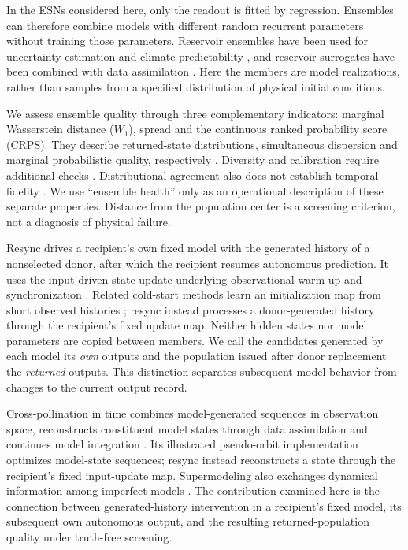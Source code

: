 \documentclass[gmd,manuscript]{copernicus}
\begin{document}
In the ESNs considered here, only the readout is fitted by regression. Ensembles can therefore combine models with different random recurrent parameters without training those parameters. Reservoir ensembles have been used for uncertainty estimation and climate predictability \citep{mcdermott2019deep,nadiga2021reservoir}, and reservoir surrogates have been combined with data assimilation \citep{tomizawa2021combining,penny2022integrating}. Here the members are model realizations, rather than samples from a specified distribution of physical initial conditions.

We assess ensemble quality through three complementary indicators: marginal Wasserstein distance ($W_1$), spread and the continuous ranked probability score (CRPS). They describe returned-state distributions, simultaneous dispersion and marginal probabilistic quality, respectively \citep{gneiting2007proper,leutbecher2008ensemble}. Diversity and calibration require additional checks \citep{pennell2010number,kuncheva2003measures,gneiting2007calibration}. Distributional agreement also does not establish temporal fidelity \citep{hess2023generalized,koppe2019identifying}. We use ``ensemble health'' only as an operational description of these separate properties. Distance from the population center is a screening criterion, not a diagnosis of physical failure.

Resync drives a recipient's own fixed model with the generated history of a nonselected donor, after which the recipient resumes autonomous prediction. It uses the input-driven state update underlying observational warm-up and synchronization \citep{pecora1990synchronization,lu2018attractor}. Related cold-start methods learn an initialization map from short observed histories \citep{grigoryeva2024coldstarting}; resync instead processes a donor-generated history through the recipient's fixed update map. Neither hidden states nor model parameters are copied between members. We call the candidates generated by each model its \emph{own} outputs and the population issued after donor replacement the \emph{returned} outputs. This distinction separates subsequent model behavior from changes to the current output record.

Cross-pollination in time combines model-generated sequences in observation space, reconstructs constituent model states through data assimilation and continues model integration \citep{du2017crosspollination}. Its illustrated pseudo-orbit implementation optimizes model-state sequences; resync instead reconstructs a state through the recipient's fixed input-update map. Supermodeling also exchanges dynamical information among imperfect models \citep{schevenhoven2019supermodels}. The contribution examined here is the connection between generated-history intervention in a recipient's fixed model, its subsequent own autonomous output, and the resulting returned-population quality under truth-free screening.
\end{document}
